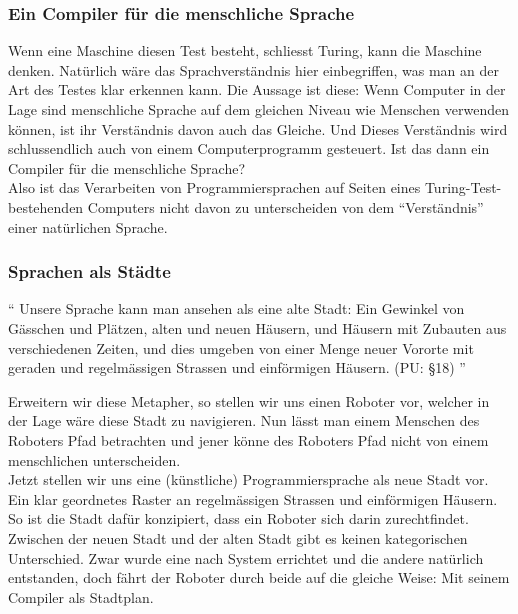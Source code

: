 \documentclass[a4paper,10pt]{article}
\begin{document}
\subsubsection{Ein Compiler für die menschliche Sprache}
Wenn eine Maschine diesen Test besteht, schliesst Turing, kann die Maschine denken. Natürlich wäre das Sprachverständnis hier einbegriffen, was man an der Art des Testes klar erkennen kann. Die Aussage ist diese: Wenn Computer in der Lage sind menschliche Sprache auf dem gleichen Niveau wie Menschen verwenden können, ist ihr Verständnis davon auch das Gleiche. Und Dieses Verständnis wird schlussendlich auch von einem Computerprogramm gesteuert. Ist das dann ein Compiler für die menschliche Sprache? \\
Also ist das Verarbeiten von Programmiersprachen auf Seiten eines Turing-Test-bestehenden Computers nicht davon zu unterscheiden von dem \enquote{Verständnis} einer natürlichen Sprache. \\
\begin{displayquote}

\subsubsection{Sprachen als Städte}
\enquote{
Unsere Sprache kann man ansehen als eine alte Stadt: Ein Gewinkel von Gässchen und Plätzen, alten und neuen Häusern, und Häusern mit Zubauten aus verschiedenen Zeiten, und dies umgeben von einer Menge neuer Vororte mit geraden und regelmässigen Strassen und einförmigen Häusern. (PU: §18)
}
\end{displayquote}
Erweitern wir diese Metapher, so stellen wir uns einen Roboter vor, welcher in der Lage wäre diese Stadt zu navigieren. Nun lässt man einem Menschen des Roboters Pfad betrachten und jener könne des Roboters Pfad nicht von einem menschlichen unterscheiden.  \\
Jetzt stellen wir uns eine (künstliche) Programmiersprache als neue Stadt vor. Ein klar geordnetes Raster an regelmässigen Strassen und einförmigen Häusern. So ist die Stadt dafür konzipiert, dass ein Roboter sich darin zurechtfindet. Zwischen der neuen Stadt und der alten Stadt gibt es keinen kategorischen Unterschied. Zwar wurde eine nach System errichtet und die andere natürlich entstanden, doch fährt der Roboter durch beide auf die gleiche Weise: Mit seinem Compiler als Stadtplan.
\end{document}
